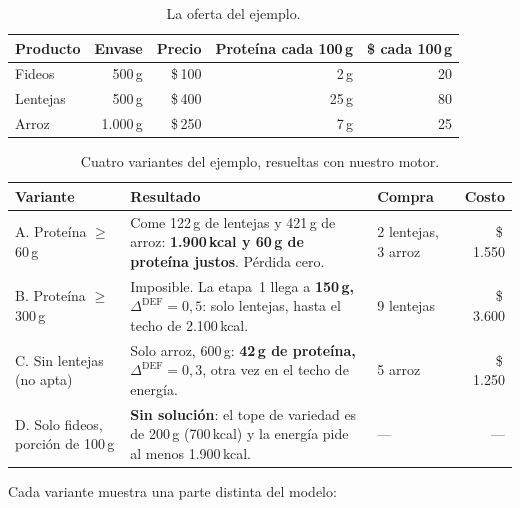 \documentclass[10pt,a4paper]{article}
\newcommand{\pesos}[1]{\$\,#1}
\newcommand{\Ddef}{\Delta^{\mathrm{DEF}}}
\begin{document}
\begin{table}[H]
\centering\small
\caption{La oferta del ejemplo.}
\label{tab:juguete}
\begin{tabular}{lrrrr}
\toprule
\textbf{Producto} & \textbf{Envase} & \textbf{Precio} & \textbf{Proteína cada 100\,g} & \textbf{\$ cada 100\,g} \\
\midrule
Fideos   & 500\,g   & \pesos{100} & 2\,g  & 20 \\
Lentejas & 500\,g   & \pesos{400} & 25\,g & 80 \\
Arroz    & 1.000\,g & \pesos{250} & 7\,g  & 25 \\
\bottomrule
\end{tabular}
\end{table}

\begin{table}[H]
\centering\small
\caption{Cuatro variantes del ejemplo, resueltas con nuestro motor.}
\label{tab:juguete-res}
\renewcommand{\arraystretch}{1.2}
\begin{tabularx}{\linewidth}{@{}lXlr@{}}
\toprule
\textbf{Variante} & \textbf{Resultado} & \textbf{Compra} & \textbf{Costo} \\
\midrule
A. Proteína $\geq$ 60\,g & Come 122\,g de lentejas y 421\,g de arroz: \textbf{1.900\,kcal y 60\,g de proteína justos}. Pérdida cero. & 2 lentejas, 3 arroz & \pesos{1.550} \\
B. Proteína $\geq$ 300\,g & Imposible. La etapa~1 llega a \textbf{150\,g, $\Ddef = 0{,}5$}: solo lentejas, hasta el techo de 2.100\,kcal. & 9 lentejas & \pesos{3.600} \\
C. Sin lentejas (no apta) & Solo arroz, 600\,g: \textbf{42\,g de proteína, $\Ddef = 0{,}3$}, otra vez en el techo de energía. & 5 arroz & \pesos{1.250} \\
D. Solo fideos, porción de 100\,g & \textbf{Sin solución}: el tope de variedad es de 200\,g (700\,kcal) y la energía pide al menos 1.900\,kcal. & — & — \\
\bottomrule
\end{tabularx}
\end{table}

Cada variante muestra una parte distinta del modelo:
\end{document}
